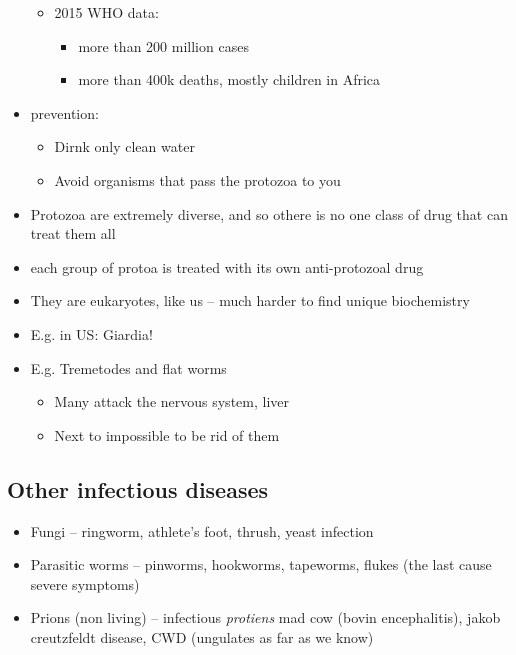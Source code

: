 \documentclass{article}
\theoremstyle{definition}
\begin{document}
\begin{itemize}
\begin{itemize}
			\item 2015 WHO data:
				\begin{itemize}
					\item more than 200 million cases 
					\item more than 400k deaths, mostly children in Africa
				\end{itemize}
		\end{itemize}
	\item prevention:
		\begin{itemize}
			\item Dirnk only clean water
			\item Avoid organisms that pass the protozoa to you
		\end{itemize}
	\item Protozoa are extremely diverse, and so othere is no one class of drug that can treat them all
	\item each group of protoa is treated with its own anti-protozoal drug
	\item They are eukaryotes, like us -- much harder to find unique biochemistry
	\item E.g. in US: Giardia!
	\item E.g. Tremetodes and flat worms
		\begin{itemize}
			\item Many attack the nervous system, liver
			\item Next to impossible to be rid of them
		\end{itemize}
\end{itemize}
\subsection{Other infectious diseases}
\begin{itemize}
	\item Fungi -- ringworm, athlete's foot, thrush, yeast infection
	\item Parasitic worms -- pinworms, hookworms, tapeworms, flukes (the last cause severe symptoms)
	\item Prions (non living)  -- infectious \textit{protiens} mad cow (bovin encephalitis), jakob creutzfeldt disease, CWD (ungulates as far as we know)
\end{itemize}
\end{document}
